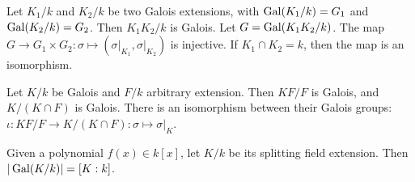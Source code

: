 \begin{theorem}
    Let $K_1/k$ and $K_2/k$ be two Galois extensions, with $\operatorname{Gal}(K_1/k) = G_1$ and $\operatorname{Gal}(K_2/k) = G_2$.
    Then $K_1 K_2/k$ is Galois. Let $G = \operatorname{Gal}(K_1K_2/k)$.
    The map $G \to G_1 \times G_2 : \sigma \mapsto (\sigma \Big|_{K_1}, \sigma \Big|_{K_2})$
    is injective. If $K_1 \cap K_2 = k$, then the map is an isomorphism.
\end{theorem}

\begin{theorem}
    Let $K/k$ be Galois and $F/k$ arbitrary extension. Then $KF/F$ is Galois,
    and $K/(K\cap F)$ is Galois. There is an isomorphism between their Galois groups:
    $\iota: KF/F \to K/(K \cap F) : \sigma \mapsto \sigma \Big|_{K}$.
\end{theorem}

\begin{theorem}
    Given a polynomial $f(x) \in k[x]$, let $K/k$ be its splitting field extension.
    Then $|\operatorname{Gal}(K/k)| = [K: k]$.
\end{theorem}
